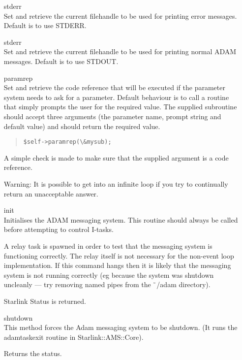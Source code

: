 \documentclass[twoside,11pt]{article}
\newenvironment{myquote}{\begin{quote}\begin{small}}{\end{small}\end{quote}}
\renewcommand{\_}{\texttt{\symbol{95}}}
\begin{document}
\begin{itemize}
\item[stderr]%
%
\hfill\\
Set and retrieve the current filehandle to be used for printing
error messages. Default is to use STDERR.

\item[stderr]%
%
\hfill\\
Set and retrieve the current filehandle to be used for printing
normal ADAM messages. Default is to use STDOUT.

\item[paramrep]%
%
\hfill\\
Set and retrieve the code reference that will be executed if
the parameter system needs to ask for a parameter.
Default behaviour is to call a routine that simply prompts
the user for the required value. The supplied subroutine
should accept three arguments (the parameter name, prompt string and
default value) and should return the required value.
\begin{myquote}
\begin{verbatim}
$self->paramrep(\&mysub);
\end{verbatim}
\end{myquote}

A simple check is made to make sure that the supplied argument
is a code reference.

Warning: It is possible to get into an infinite loop if you try
to continually return an unacceptable answer.

\item[init]%
%
\hfill\\
Initialises the ADAM messaging system. This routine should always be
called before attempting to control I-tasks.

A relay task is spawned in order to test that the messaging system
is functioning correctly. The relay itself is not necessary for the
non-event loop implementation. If this command hangs then it is
likely that the messaging system is not running correctly (eg
because the system was shutdown uncleanly --- try removing named pipes
from the $\tilde{\hspace{0.4em}}$/adam directory).

Starlink Status is returned.

\item[shutdown]%
%
\hfill\\
This method forces the Adam messaging system to be shutdown.
(It runs the adamtask\_exit routine in Starlink::AMS::Core).

Returns the status.

\end{itemize}
\end{document}
